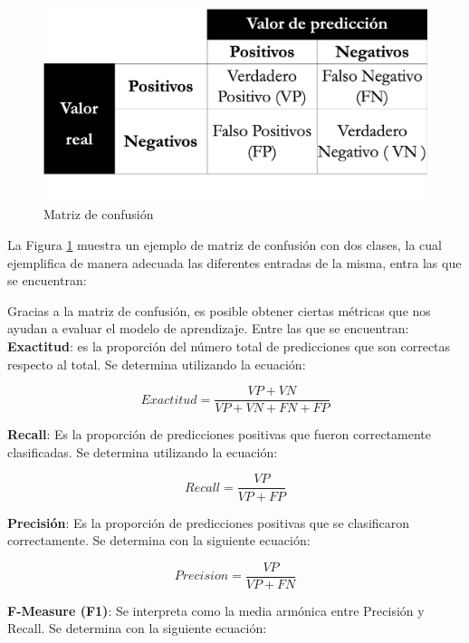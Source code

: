 \begin{figure}[h]
	\centering
	\includegraphics[scale=.35]{imagenes/Resultados/MatrizC.png}
	\caption{Matriz de confusión}
	\label{Fig:mconfu}
\end{figure}

La Figura \ref{Fig:mconfu} muestra un ejemplo de matriz de confusión con dos clases, la cual ejemplifica de
manera adecuada las diferentes entradas de la misma, entra las que se encuentran:


Gracias a la matriz de confusión, es posible obtener ciertas métricas que nos ayudan a evaluar el modelo
de aprendizaje. Entre las que se encuentran:\\


\textbf{Exactitud}: es la proporción del número total de predicciones que son correctas respecto al total.
Se determina utilizando la ecuación:

\begin{equation}\label{eq:1}
	Exactitud = \frac{VP+VN}{VP+VN+FN+FP}
\end{equation}

\textbf{Recall}: Es la proporción de predicciones positivas que fueron correctamente clasificadas. Se determina
utilizando la ecuación:


\begin{equation}\label{eq:2}
	Recall = \frac{VP}{VP+FP}
\end{equation}


\textbf{Precisión}: Es la proporción de predicciones positivas que se clasificaron correctamente. Se determina
con la siguiente ecuación:


\begin{equation}\label{eq:3}
	Precision = \frac{VP}{VP+FN}
\end{equation}


\textbf{F-Measure (F1)}: Se interpreta como la media armónica entre Precisión y Recall. Se determina
con la siguiente ecuación:

